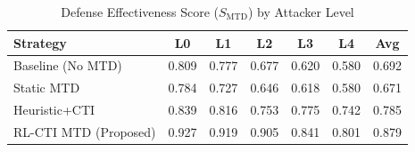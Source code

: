 \begin{table}[!t]
\centering
\caption{Defense Effectiveness Score ($S_{\mathrm{MTD}}$) by Attacker Level}
\label{tab:level_performance}
\renewcommand{\arraystretch}{1.1}
\begin{tabular}{@{}lcccccc@{}}
\toprule
\textbf{Strategy} & \textbf{L0} & \textbf{L1} & \textbf{L2} & \textbf{L3} & \textbf{L4} & \textbf{Avg} \\
\midrule
Baseline (No MTD) & 0.809 & 0.777 & 0.677 & 0.620 & 0.580 & 0.692 \\
Static MTD & 0.784 & 0.727 & 0.646 & 0.618 & 0.580 & 0.671 \\
Heuristic+CTI & 0.839 & 0.816 & 0.753 & 0.775 & 0.742 & 0.785 \\
RL-CTI MTD (Proposed) & 0.927 & 0.919 & 0.905 & 0.841 & 0.801 & 0.879 \\
\bottomrule
\end{tabular}
\end{table}

